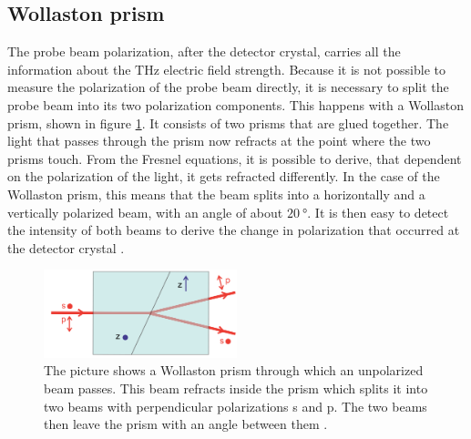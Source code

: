\FloatBarrier
\subsection{Wollaston prism}
\label{sec:wollaston}
The probe beam polarization, after the detector crystal, carries all the information about the $\si{\tera\hertz}$ electric field strength.
Because it is not possible to measure the polarization of the probe beam directly, it is necessary to split the probe beam into its two polarization components.
This happens with a Wollaston prism, shown in figure \ref{fig:wollaston}.
It consists of two prisms that are glued together.
The light that passes through the prism now refracts at the point where the two prisms touch.
From the Fresnel equations, it is possible to derive, that dependent on the polarization of the light, it gets refracted differently.
In the case of the Wollaston prism, this means that the beam splits into a horizontally and a vertically polarized beam, with an angle of about $\SI{20}{\degree}$.
It is then easy to detect the intensity of both beams to derive the change in polarization that occurred at the detector crystal \cite{wollaston_prism}. 
\begin{figure}
    \centering
    \includegraphics[width=0.5\textwidth]{Plots/wollaston_prism.png}
    \caption{The picture shows a Wollaston prism through which an unpolarized beam passes.
    This beam refracts inside the prism which splits it into two beams with perpendicular polarizations s and p.
    The two beams then leave the prism with an angle between them \cite{wollaston_prism}.}
    \label{fig:wollaston}
\end{figure}
